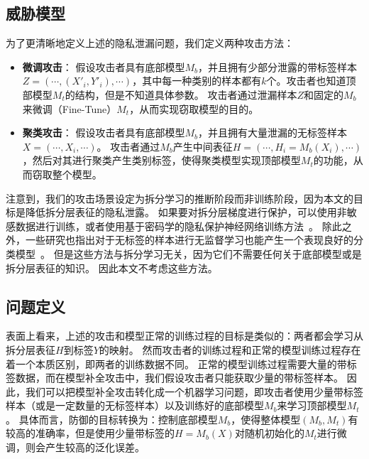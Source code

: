 \subsection{威胁模型}
为了更清晰地定义上述的隐私泄漏问题，我们定义两种攻击方法：
\begin{itemize}
    \item \textbf{微调攻击}：
    假设攻击者具有底部模型$M_b$，并且拥有少部分泄露的带标签样本$Z = (\cdots, (X'_i, Y'_i), \cdots)$，其中每一种类别的样本都有$k$个。攻击者也知道顶部模型$M_t$的结构，但是不知道具体参数。
    攻击者通过泄漏样本$Z$和固定的$M_b$来微调（Fine-Tune）$M_t$，从而实现窃取模型的目的。

    \item \textbf{聚类攻击}：
    假设攻击者具有底部模型$M_b$，并且拥有大量泄漏的无标签样本$X = (\cdots, X_i, \cdots)$。
    攻击者通过$M_b$产生中间表征$H = (\cdots, H_i = M_b(X_i), \cdots)$，然后对其进行聚类产生类别标签，使得聚类模型实现顶部模型$M_t$的功能，从而窃取整个模型。
\end{itemize}

注意到，我们的攻击场景设定为拆分学习的推断阶段而非训练阶段，因为本文的目标是降低拆分层表征的隐私泄露。
%
如果要对拆分层梯度进行保护，可以使用非敏感数据进行训练，或者使用基于密码学的隐私保护神经网络训练方法~\cite{mohassel2017secureml,wagh2019securenn}。
%
除此之外，一些研究也指出对于无标签的样本进行无监督学习也能产生一个表现良好的分类模型~\cite{berthelot2019mixmatch,xuyi2021dp_ssl}。
但是这些方法与拆分学习无关，因为它们不需要任何关于底部模型或是拆分层表征的知识。
因此本文不考虑这些方法。
%

\subsection{问题定义}
表面上看来，上述的攻击和模型正常的训练过程的目标是类似的：两者都会学习从拆分层表征$H$到标签$Y$的映射。
%
然而攻击者的训练过程和正常的模型训练过程存在着一个本质区别，即两者的训练数据不同。
正常的模型训练过程需要大量的带标签数据，而在模型补全攻击中，我们假设攻击者只能获取少量的带标签样本。
%
因此，我们可以把模型补全攻击转化成一个机器学习问题，即攻击者使用少量带标签样本（或是一定数量的无标签样本）以及训练好的底部模型$M_b$来学习顶部模型$M_t$。
具体而言，防御的目标转换为：控制底部模型$M_b$，使得整体模型$(M_b, M_t)$有较高的准确率，但是使用少量带标签的$H = M_b(X)$对随机初始化的$M_t$进行微调，则会产生较高的泛化误差。
%

